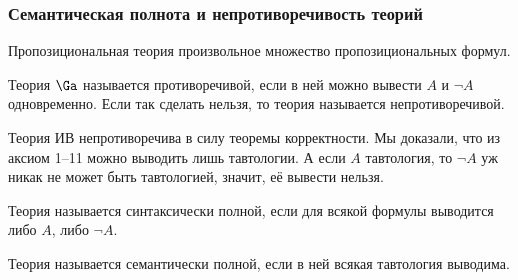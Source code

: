\documentclass[a4paper,draft]{article}
\begin{document}
\subsubsection{Семантическая полнота и непротиворечивость теорий}

\begin{df}
  Пропозициональная теория произвольное множество пропозициональных формул.
\end{df}

\begin{df}
  Теория $\Ga$ называется противоречивой, если в ней можно вывести $A$ и $\neg A$ одновременно.
  Если так сделать нельзя, то теория называется непротиворечивой.
\end{df}

\begin{ex}
  Теория ИВ непротиворечива в силу теоремы корректности.
  Мы доказали, что из аксиом 1--11 можно выводить лишь тавтологии.
  А если $A$ тавтология, то $\neg A$ уж никак не может быть тавтологией,
  значит, её вывести нельзя.
\end{ex}

\begin{df}
  Теория называется синтаксически полной, если для всякой формулы выводится либо $A$, либо $\neg A$.
\end{df}

\begin{df}
  Теория называется семантически полной, если в ней всякая тавтология выводима.
\end{df}
\end{document}
